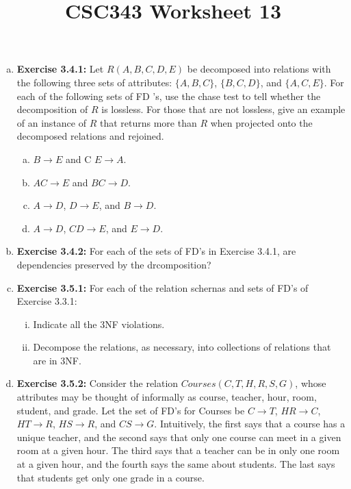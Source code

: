 \documentclass[12pt]{article}
\begin{document}
\title{CSC343 Worksheet 13}
\maketitle

\begin{enumerate}[a)]
    \item \textbf{Exercise 3.4.1:} Let $R(A, B, C, D, E)$ be decomposed into relations with the
    following three sets of attributes: $\{A, B, C\}$, $\{B, C, D\}$, and $\{A, C, E\}$. For each
    of the following sets of FD 's, use the chase test to tell whether the decomposition
    of $R$ is lossless. For those that are not lossless, give an example of an instance
    of $R$ that returns more than $R$ when projected onto the decomposed relations
    and rejoined.

    \begin{enumerate}[a)]
        \item $B \to E$ and C $E \to A$.
        \item $AC \to E$ and $BC \to D$.
        \item $A \to D$, $D \to E$, and $B \to D$.
        \item $A \to D$, $CD \to E$, and $E \to D$.
    \end{enumerate}

    \item \textbf{Exercise 3.4.2:} For each of the sets of FD's in Exercise 3.4.1,
    are dependencies preserved by the drcomposition?

    \item \textbf{Exercise 3.5.1:} For each of the relation schernas and sets of FD's of Exercise
    3.3.1:

    \bigskip

    \begin{enumerate}[i)]
        \item Indicate all the 3NF violations.
        \item Decompose the relations, as necessary, into collections of relations that are in 3NF.
    \end{enumerate}

    \item \textbf{Exercise 3.5.2:} Consider the relation $Courses(C, T, H, R, S, G)$,
    whose attributes may be thought of informally as course, teacher, hour, room, student,
    and grade. Let the set of FD's for Courses be $C\to T$, $HR\to C$, $HT\to R$,
    $HS\to R$, and $CS\to G$. Intuitively, the first says that a course has a unique
    teacher, and the second says that only one course can meet in a given room at
    a given hour. The third says that a teacher can be in only one room at a given
    hour, and the fourth says the same about students. The last says that students
    get only one grade in a course.


\end{enumerate}
\end{document}
